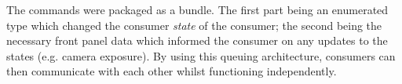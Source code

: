 The commands were packaged as a bundle.
The first part being an enumerated type which changed the consumer \emph{state} of the consumer; the second being the necessary front panel data which informed the consumer on any updates to the states (e.g. camera exposure).
By using this queuing architecture, consumers can then communicate with each other whilst functioning independently.



%
%
%
